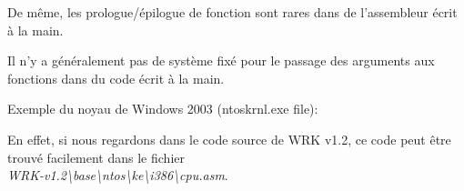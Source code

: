 \par
De même, les prologue/épilogue de fonction sont rares dans de l'assembleur écrit
à la main.
\par

Il n'y a généralement pas de système fixé pour le passage des arguments aux fonctions
dans du code écrit à la main.

\par
Exemple du noyau de Windows 2003
(ntoskrnl.exe file):



En effet, si nous regardons dans le code source de \ac{WRK} v1.2, ce code peut être
trouvé facilement dans le fichier \\
\emph{WRK-v1.2\textbackslash{}base\textbackslash{}ntos\textbackslash{}ke\textbackslash{}i386\textbackslash{}cpu.asm}.

